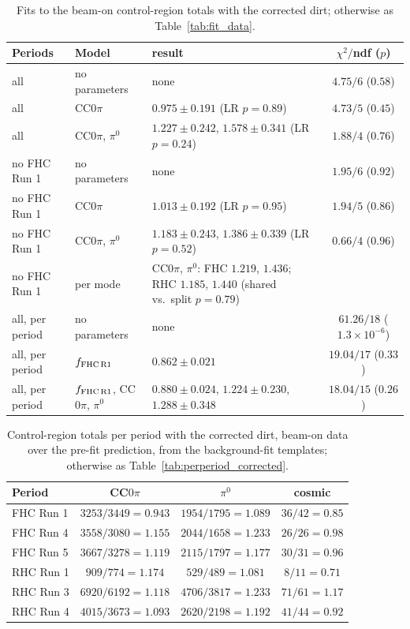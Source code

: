 \documentclass[11pt,a4paper]{article}
\begin{document}
\begin{table}[H]
  \centering
  \caption{Fits to the beam-on control-region totals with the corrected dirt; otherwise as Table~\ref{tab:fit_data}.}
  \label{tab:fit_dirtfix}
  \footnotesize\setlength{\tabcolsep}{4pt}
  \begin{tabular}{llp{}c}
    \toprule
    Periods & Model & result & $\chi^2/$ndf ($p$) \\
    \midrule
    all & no parameters & none & $4.75/6$ ($0.58$) \\
    all & CC$0\pi$ & $0.975\pm0.191$ (LR $p=0.89$) & $4.73/5$ ($0.45$) \\
    all & CC$0\pi$, $\pi^0$ & $1.227\pm0.242$, $1.578\pm0.341$ (LR $p=0.24$) & $1.88/4$ ($0.76$) \\
    no FHC Run 1 & no parameters & none & $1.95/6$ ($0.92$) \\
    no FHC Run 1 & CC$0\pi$ & $1.013\pm0.192$ (LR $p=0.95$) & $1.94/5$ ($0.86$) \\
    no FHC Run 1 & CC$0\pi$, $\pi^0$ & $1.183\pm0.243$, $1.386\pm0.339$ (LR $p=0.52$) & $0.66/4$ ($0.96$) \\
    no FHC Run 1 & per mode & CC$0\pi$, $\pi^0$: FHC $1.219$, $1.436$; RHC $1.185$, $1.440$ (shared vs.\ split $p=0.79$) & \\
    all, per period & no parameters & none & $61.26/18$ ($1.3\times10^{-6}$) \\
    all, per period & $f_{\rm FHC\,R1}$ & $0.862\pm0.021$ & $19.04/17$ ($0.33$) \\
    all, per period & $f_{\rm FHC\,R1}$, CC$0\pi$, $\pi^0$ & $0.880\pm0.024$, $1.224\pm0.230$, $1.288\pm0.348$ & $18.04/15$ ($0.26$) \\
    \bottomrule
  \end{tabular}
\end{table}

\begin{table}[H]
  \centering
  \caption{Control-region totals per period with the corrected dirt, beam-on data over the pre-fit prediction, from
    the background-fit templates; otherwise as Table~\ref{tab:perperiod_corrected}.}
  \label{tab:perperiod_dirtfix}
  \small
  \begin{tabular}{lccc}\toprule
    Period & CC$0\pi$ & $\pi^0$ & cosmic \\ \midrule
    FHC Run 1 & $3253/3449 = 0.943$ & $1954/1795 = 1.089$ & $36/42 = 0.85$ \\
    FHC Run 4 & $3558/3080 = 1.155$ & $2044/1658 = 1.233$ & $26/26 = 0.98$ \\
    FHC Run 5 & $3667/3278 = 1.119$ & $2115/1797 = 1.177$ & $30/31 = 0.96$ \\
    RHC Run 1 & $909/774 = 1.174$ & $529/489 = 1.081$ & $8/11 = 0.71$ \\
    RHC Run 3 & $6920/6192 = 1.118$ & $4706/3817 = 1.233$ & $71/61 = 1.17$ \\
    RHC Run 4 & $4015/3673 = 1.093$ & $2620/2198 = 1.192$ & $41/44 = 0.92$ \\
    \bottomrule
  \end{tabular}
\end{table}
\end{document}
